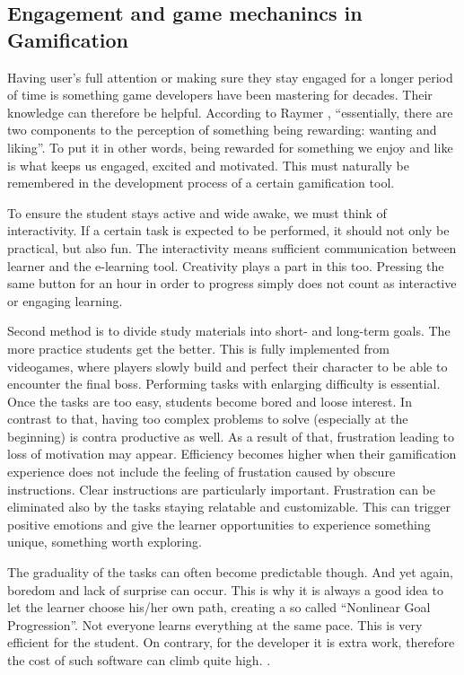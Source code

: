 \documentclass[10pt,twoside,english,a4paper]{article}
\begin{document}
\subsection{Engagement and game mechanincs in Gamification} \label{section3.1}
	Having user’s full attention or making sure they stay engaged for a longer period of time is something game developers have been mastering for decades. Their knowledge can therefore be helpful. 
	According to Raymer \cite{Raymer}, “essentially, there are two components to the perception of something being rewarding: wanting and liking”. 
	To put it in other words, being rewarded for something we enjoy and like is what keeps us engaged, excited and motivated. 
	This must naturally be remembered in the development process of a certain gamification tool.

	To ensure the student stays active and wide awake, we must think of interactivity. If a certain task is expected to be performed, it should not only be practical, but also fun. 
	The interactivity means sufficient communication between learner and the e-learning tool. Creativity plays a part in this too. Pressing the same button for an hour in order to progress simply does not count as interactive or engaging learning. \cite{ AL-Smadi} 
	
	Second method is to divide study materials into short- and long-term goals. The more practice students get the better. This is fully implemented from videogames, where players slowly build and perfect their character to be able to encounter the final boss. 
	Performing tasks with enlarging difficulty is essential. Once the tasks are too easy, students become bored and loose interest. In contrast to that, having too complex problems to solve (especially at the beginning) is contra productive as well. 
	As a result of that, frustration leading to loss of motivation may appear. Efficiency becomes higher when their gamification experience does not include the feeling of frustation caused by obscure instructions. Clear instructions are particularly important. \cite{Raymer} 
	Frustration can be eliminated also by the tasks staying relatable and customizable. This can trigger positive emotions and give the learner opportunities to experience something unique, something worth exploring. \cite{ AL-Smadi}
	
	The graduality of the tasks can often become predictable though. And yet again, boredom and lack of surprise can occur. This is why it is always a good idea to let the learner choose his/her own path, creating a so called “Nonlinear Goal Progression”. Not everyone learns everything at the same pace.
	This is very efficient for the student. On contrary, for the developer it is extra work, therefore the cost of such software can climb quite high. \cite{Raymer}.
\end{document}

